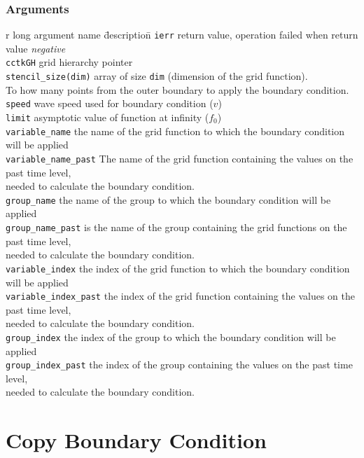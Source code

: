 \documentclass{article}
\begin{document}
\subsubsection*{Arguments}
\begin{tabbing}
r long argument name \= description\=\kill
{\tt ierr} \> return value, operation failed when return
value {\em negative}\\
{\tt cctkGH} \> grid hierarchy pointer\\
{\tt stencil\_size(dim)} \> array of size {\tt dim}
(dimension of the grid function).\\
\> To how many points from the outer boundary to apply the boundary condition. \\
{\tt speed} \> wave speed used for boundary condition ($v$)\\
{\tt limit} \> asymptotic value of function at infinity ($f_0$)\\
{\tt variable\_name} \> the name of the grid function 
	to which the boundary condition will be applied\\
{\tt variable\_name\_past} \> The name of the grid function containing the values on the past time level,\\ 
\> needed to calculate the boundary condition.\\
{\tt group\_name} \> the name of the group to which the boundary condition will be applied\\
{\tt group\_name\_past} \> is the name of the group containing the grid functions on the past time level,\\
\> needed to calculate the boundary condition.\\
{\tt variable\_index} \> the index of the grid function to which the boundary condition will be applied\\
{\tt variable\_index\_past} \> the index of the grid function containing the values on the past time level,\\
\> needed to calculate the boundary condition.\\
{\tt group\_index} \> the index of the group to which the boundary condition will be applied\\
{\tt group\_index\_past} \> the index of the group containing the values on the past time level,\\
\> needed to calculate the boundary condition.\\
\end{tabbing}


\section{Copy Boundary Condition}
\end{document}
